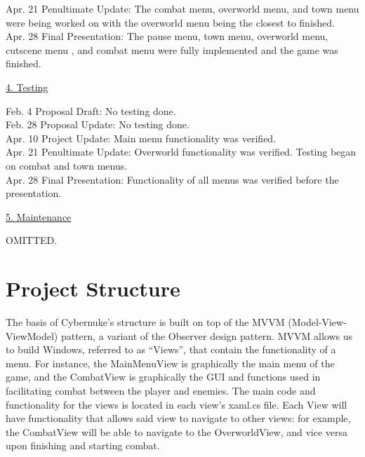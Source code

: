 \documentclass[10pt,conference,onecolumn,compsoc]{IEEEtran}
\begin{document}
Apr. 21 Penultimate Update: The combat menu, overworld menu, and town menu were being worked on with the overworld menu being the closest to finished.\\

Apr. 28 Final Presentation: The pause menu, town menu, overworld menu, cutscene menu , and combat menu were fully implemented and the game was finished.

\vspace{5px}
\underline{4. Testing}
\vspace{5px}

Feb. 4 Proposal Draft: No testing done.\\

Feb. 28 Proposal Update: No testing done.\\

Apr. 10 Project Update: Main menu functionality was verified.\\

Apr. 21 Penultimate Update: Overworld functionality was verified. Testing began on combat and town menus.\\

Apr. 28 Final Presentation: Functionality of all menus was verified before the presentation.

\vspace{5px}
\underline{5. Maintenance}
\vspace{5px}

OMITTED.


\section{Project Structure}

The basis of Cybernuke's structure is built on top of the MVVM (Model-View-ViewModel) pattern, a variant of the Observer design pattern. MVVM allows us to build Windows, referred to as “Views”, that contain the functionality of a menu. For instance, the MainMenuView is graphically the main menu of the game, and the CombatView is graphically the GUI and functions used in facilitating combat between the player and enemies. The main code and functionality for the views is located in each view's xaml.cs file. Each View will have functionality that allows said view to navigate to other views: for example, the CombatView will be able to navigate to the OverworldView, and vice versa upon finishing and starting combat.
\end{document}
